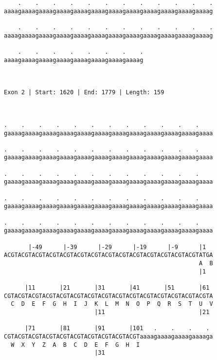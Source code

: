 \documentclass{article}
\begin{document}
\begin{Verbatim}
    .    .    .    .    .    .    .    .    .    .    .    .
aaaagaaaagaaaagaaaagaaaagaaaagaaaagaaaagaaaagaaaagaaaagaaaag
                                                            
    .    .    .    .    .    .    .    .    .    .    .    .
aaaagaaaagaaaagaaaagaaaagaaaagaaaagaaaagaaaagaaaagaaaagaaaag
                                                            
    .    .    .    .    .    .    .    .
aaaagaaaagaaaagaaaagaaaagaaaagaaaagaaaag
                                        
                                        
 
Exon 2 | Start: 1620 | End: 1779 | Length: 159



.    .    .    .    .    .    .    .    .    .    .    .    
gaaaagaaaagaaaagaaaagaaaagaaaagaaaagaaaagaaaagaaaagaaaagaaaa
                                                            
.    .    .    .    .    .    .    .    .    .    .    .    
gaaaagaaaagaaaagaaaagaaaagaaaagaaaagaaaagaaaagaaaagaaaagaaaa
                                                            
.    .    .    .    .    .    .    .    .    .    .    .    
gaaaagaaaagaaaagaaaagaaaagaaaagaaaagaaaagaaaagaaaagaaaagaaaa
                                                            
.    .    .    .    .    .    .    .    .    .    .    .    
gaaaagaaaagaaaagaaaagaaaagaaaagaaaagaaaagaaaagaaaagaaaagaaaa
                                                            
.    .    .    .    .    .    .    .    .    .    .    .    
gaaaagaaaagaaaagaaaagaaaagaaaagaaaagaaaagaaaagaaaagaaaagaaaa
                                                            
       |-49      |-39      |-29      |-19      |-9      |1  
ACGTACGTACGTACGTACGTACGTACGTACGTACGTACGTACGTACGTACGTACGTATGA
                                                        A  B
                                                        |1  
  
      |11       |21       |31       |41       |51       |61 
CGTACGTACGTACGTACGTACGTACGTACGTACGTACGTACGTACGTACGTACGTACGTA
  C  D  E  F  G  H  I  J  K  L  M  N  O  P  Q  R  S  T  U  V
                          |11                           |21 
  
      |71       |81       |91       |101   .    .    .    . 
CGTACGTACGTACGTACGTACGTACGTACGTACGTACGTaaaagaaaagaaaagaaaaga
  W  X  Y  Z  A  B  C  D  E  F  G  H  I                     
                          |31                               
  

\end{Verbatim}
\end{document}

